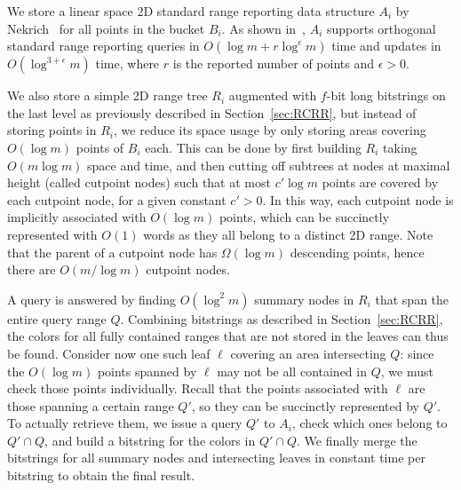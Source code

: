 We store a linear space 2D standard range reporting data structure $A_i$ by Nekrich~\cite{nekrich2009orthogonal} for all points in the bucket $B_i$. As shown in~\cite{nekrich2009orthogonal}, $A_i$ supports orthogonal standard range reporting queries in $O(\log m + r \log ^{\epsilon} m)$ time and updates in $O(\log ^{3+\epsilon} m)$ time, where $r$ is the reported number of points and $\epsilon > 0$.



We also store a simple 2D range tree $R_i$ augmented with $f$-bit long bitstrings on the last level as previously described in Section~\ref{sec:RCRR}, but instead of storing points in $R_i$, we reduce its space usage by only storing areas covering $O(\log m)$ points of $B_i$ each. This can be done by first building $R_i$ taking $O(m \log m)$ space and time, and then cutting off subtrees at nodes at maximal height (called cutpoint nodes) such that at most $c' \log m$ points are covered by each cutpoint node, for a given constant $c'>0$. In this way, each cutpoint node is implicitly associated with $O(\log m)$ points, which can be succinctly represented with $O(1)$ words as they all belong to a distinct 2D range. Note that the parent of a cutpoint node has $\Omega(\log m)$ descending points, hence there are $O(m/\log m)$ cutpoint nodes.

A query is answered by finding $O(\log^2 m)$ summary nodes in $R_i$ that span the entire query range $Q$. Combining bitstrings as described in Section~\ref{sec:RCRR}, the colors for all fully contained ranges that are not stored in the leaves can thus be found. Consider now one such leaf $\ell$ covering an area intersecting $Q$: since the $O(\log m)$ points spanned by $\ell$ may not be all contained in $Q$, we must check those points individually. Recall that the points associated with $\ell$ are those spanning a certain range $Q'$, so they can be succinctly represented by $Q'$. To actually retrieve them, we issue a query $Q'$ to $A_i$, check which ones belong to $Q' \cap Q$, and build a bitstring for the colors in $Q' \cap Q$. We finally merge the bitstrings for all summary nodes and intersecting leaves in constant time per bitstring to obtain the final result.

